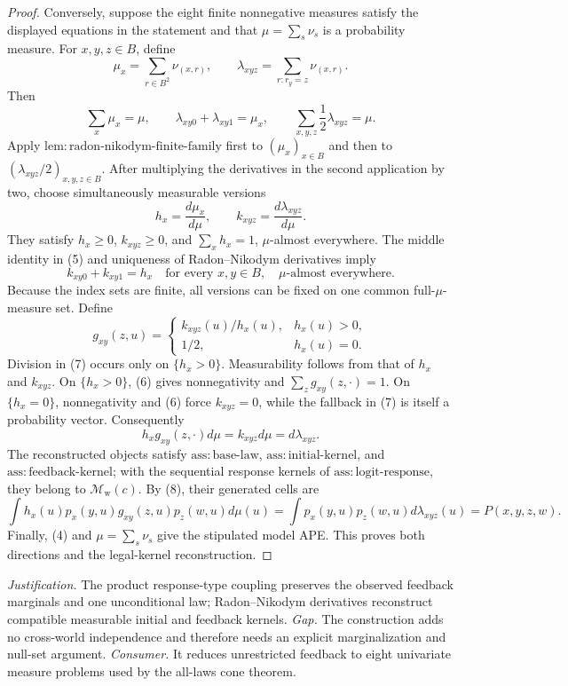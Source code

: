 \documentclass{article}
\begin{document}
\begin{proof}
Conversely, suppose the eight finite nonnegative measures satisfy the displayed equations in the statement and that \(\mu=\sum_s\nu_s\) is a probability measure.  For \(x,y,z\in B\), define
\[
 \mu_x=\sum_{r\in B^2}\nu_{(x,r)},
 \qquad
 \lambda_{xyz}=\sum_{r:r_y=z}\nu_{(x,r)}.
\]
Then
\[
 \sum_x\mu_x=\mu,
 \qquad
 \lambda_{xy0}+\lambda_{xy1}=\mu_x,
 \qquad
 \sum_{x,y,z}\frac12\lambda_{xyz}=\mu. \tag{5}
\]
Apply \(\mathrm{lem{:}radon\text{-}nikodym\text{-}finite\text{-}family}\) first to \((\mu_x)_{x\in B}\) and then to \((\lambda_{xyz}/2)_{x,y,z\in B}\).  After multiplying the derivatives in the second application by two, choose simultaneously measurable versions
\[
 h_x=\frac{d\mu_x}{d\mu},
 \qquad
 k_{xyz}=\frac{d\lambda_{xyz}}{d\mu}.
\]
They satisfy \(h_x\ge0\), \(k_{xyz}\ge0\), and \(\sum_xh_x=1\), \(\mu\)-almost everywhere.  The middle identity in (5) and uniqueness of Radon--Nikodym derivatives imply
\[
 k_{xy0}+k_{xy1}=h_x
 \quad\text{for every }x,y\in B,
 \quad\mu\text{-almost everywhere}. \tag{6}
\]
Because the index sets are finite, all versions can be fixed on one common full-\(\mu\)-measure set.  Define
\[
 g_{xy}(z,u)=
 \begin{cases}
 k_{xyz}(u)/h_x(u),&h_x(u)>0,\\
 1/2,&h_x(u)=0.
 \end{cases} \tag{7}
\]
Division in (7) occurs only on \(\{h_x>0\}\).  Measurability follows from that of \(h_x\) and \(k_{xyz}\).  On \(\{h_x>0\}\), (6) gives nonnegativity and \(\sum_zg_{xy}(z,\cdot)=1\).  On \(\{h_x=0\}\), nonnegativity and (6) force \(k_{xyz}=0\), while the fallback in (7) is itself a probability vector.  Consequently
\[
 h_xg_{xy}(z,\cdot)d\mu=k_{xyz}d\mu=d\lambda_{xyz}. \tag{8}
\]
The reconstructed objects satisfy \(\mathrm{ass{:}base\text{-}law}\), \(\mathrm{ass{:}initial\text{-}kernel}\), and \(\mathrm{ass{:}feedback\text{-}kernel}\); with the sequential response kernels of \(\mathrm{ass{:}logit\text{-}response}\), they belong to \(\mathcal M_{\mathrm w}(c)\).  By (8), their generated cells are
\[
 \int h_x(u)p_x(y,u)g_{xy}(z,u)p_z(w,u)d\mu(u)
 =\int p_x(y,u)p_z(w,u)d\lambda_{xyz}(u)
 =P(x,y,z,w). \tag{9}
\]
Finally, (4) and \(\mu=\sum_s\nu_s\) give the stipulated model APE.  This proves both directions and the legal-kernel reconstruction.
\end{proof}
\par\smallskip\noindent \textit{Justification.} The product response-type coupling preserves the observed feedback marginals and one unconditional law; Radon--Nikodym derivatives reconstruct compatible measurable initial and feedback kernels. \textit{Gap.} The construction adds no cross-world independence and therefore needs an explicit marginalization and null-set argument. \textit{Consumer.} It reduces unrestricted feedback to eight univariate measure problems used by the all-laws cone theorem.
\end{document}
